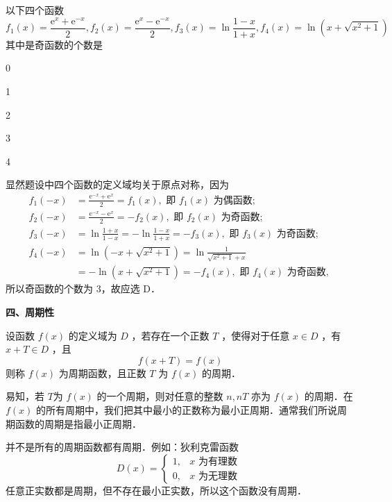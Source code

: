 \begin{example}
	
以下四个函数	
	\begin{equation*}  
		f_1(x)=\frac{\mathrm{e}^x+\mathrm{e}^{-x}}{2} ,f_2(x)=\frac{\mathrm{e}^x-\mathrm{e}^{-x}}{2} , f_3(x)=\ln \frac{1-x}{1+x} ,f_4(x)=\ln \left(x+\sqrt{x^2+1}\right)   
	\end{equation*} 
其中是奇函数的个数是	\fillparen[ ]
	\begin{choices}[columns=5]
		\item 0
		\item 1
		\item 2
		\item 3
		\item 4	
	\end{choices}
	\vspace{3cm} 
\end{example}
\begin{solution}
显然题设中四个函数的定义域均关于原点对称，因为
$$
\begin{aligned}
	f_1(-x) & =\frac{\mathrm{e}^{-x}+\mathrm{e}^x}{2}=f_1(x), \text { 即 } f_1(x) \text { 为偶函数; } \\
	f_2(-x) & =\frac{\mathrm{e}^{-x}-\mathrm{e}^x}{2}=-f_2(x), \text { 即 } f_2(x) \text { 为奇函数; } \\
	f_3(-x) & =\ln \frac{1+x}{1-x}=-\ln \frac{1-x}{1+x}=-f_3(x), \text { 即 } f_3(x) \text { 为奇函数; } \\
	f_4(-x) & =\ln \left(-x+\sqrt{x^2+1}\right)=\ln \frac{1}{\sqrt{x^2+1}+x} \\
	& =-\ln \left(x+\sqrt{x^2+1}\right)=-f_4(x), \text { 即 } f_4(x) \text { 为奇函数, }
\end{aligned}
$$
所以奇函数的个数为 3，故应选 D．	
\end{solution}


\noindent \textbf{四、周期性}
\begin{definition*}[周期性]
设函数 $f(x)$ 的定义域为 $D$ ，若存在一个正数 $T$ ，使得对于任意 $x \in D$ ，有 $x+T \in D$ ，且 $$f(x+ T)=f(x)$$则称 $f(x)$ 为周期函数，且正数 $T$ 为 $f(x)$ 的周期．	
\end{definition*}
易知，若 $T$为 $f(x)$ 的一个周期，则对任意的整数 $n, n T$ 亦为 $f(x)$ 的周期．在 $f(x)$ 的所有周期中，我们把其中最小的正数称为最小正周期．通常我们所说周期函数的周期是指最小正周期．

并不是所有的周期函数都有周期．例如：狄利克雷函数
$$
D(x)= \begin{cases}1, & x \text { 为有理数 } \\ 0, & x \text { 为无理数 }\end{cases}
$$
任意正实数都是周期，但不存在最小正实数，所以这个函数没有周期．


